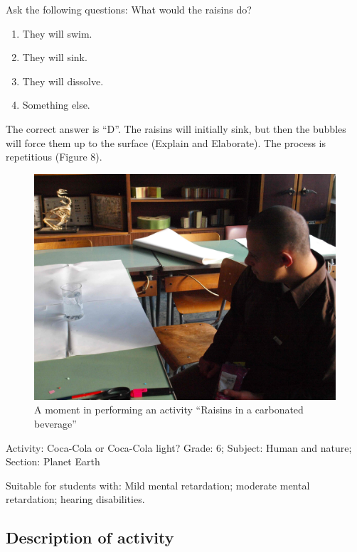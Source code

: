 \documentclass[11.5pt]{sig-alternate} %
\begin{document}
\begin{large}
Ask the following questions: What would the raisins do?
\begin{enumerate}[label=\Alph*]
    \item They will swim.
    \item They will sink.
    \item They will dissolve.
    \item Something else.
\end{enumerate}

The correct answer is “D”. The raisins will initially sink, but then the bubbles will force them up to the surface (Explain and Elaborate). The process is repetitious (Figure 8).
 \newpage
\begin{figure}[h]
    \centering
    \includegraphics[width=0.95\linewidth]{images/fig8.jpg}
    \caption{A moment in performing an activity “Raisins in a carbonated beverage”}
\end{figure}

Activity: Coca-Cola or Coca-Cola light? Grade: 6; Subject: Human and nature; Section: Planet Earth

Suitable for students with: Mild mental retardation; moderate mental retardation; hearing disabilities.

\subsection*{Description of activity}


\end{large}
\end{document}
